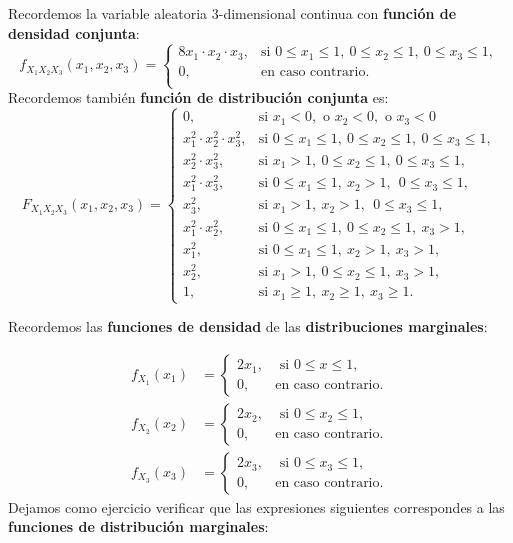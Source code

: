 \documentclass[]{book}
\begin{document}
Recordemos la variable aleatoria \(3\)-dimensional continua con \textbf{función de densidad conjunta}:
\[
f_{X_1X_2X_3}(x_1,x_2,x_3)=\begin{cases}
8 x_1\cdot x_2\cdot x_3, & \mbox{si }0\leq x_1\leq 1,\ 0\leq x_2\leq 1,\ 0\leq x_3\leq 1, \\
0, & \mbox{en caso contrario.}\\
\end{cases}
\]
Recordemos también \textbf{función de distribución conjunta} es:
\[
F_{X_1X_2X_3}(x_1,x_2,x_3)=\begin{cases}
0, & \mbox{si }x_1<0,\mbox{ o }x_2<0,\mbox{ o }x_3 <0\\
x_1^2\cdot x_2^2\cdot x_3^2, & \mbox{si }0\leq x_1\leq 1,\ 0\leq x_2\leq 1,\ 0\leq x_3\leq 1, \\
 x_2^2\cdot x_3^2, & \mbox{si }x_1> 1,\ 0\leq x_2\leq  1,\ 0\leq x_3\leq  1, \\
 x_1^2\cdot x_3^2, & \mbox{si }0\leq x_1\leq  1,\ x_2> 1,\ \ 0\leq x_3\leq  1, \\
 x_3^2, & \mbox{si }x_1> 1,\ x_2> 1,\ \ 0\leq x_3\leq  1, \\
 x_1^2\cdot x_2^2, & \mbox{si }0\leq x_1\leq  1,\ 0\leq x_2\leq  1,\ x_3> 1,\\
 x_1^2, & \mbox{si }0\leq x_1\leq  1,\ x_2 >  1,\ x_3> 1,\\
 x_2^2, & \mbox{si }x_1>1,\ 0\leq x_2\leq  1,\ x_3> 1,\\
1, & \mbox{si }x_1\geq 1,\ x_2\geq 1,\ x_3\geq 1.
\end{cases}
\]

Recordemos las \textbf{funciones de densidad} de las \textbf{distribuciones marginales}:

\[
\begin{array}{rl}
f_{X_1}(x_1) & =\begin{cases}
2x_1, & \mbox{ si }0\leq x\leq 1,\\
0, & \mbox{en caso contrario.}
\end{cases}\\ 
f_{X_2}(x_2)&=\begin{cases}
2x_2, & \mbox{ si }0\leq x_2\leq 1,\\
0, & \mbox{en caso contrario.}
\end{cases}\\ f_{X_3}(x_3) & =\begin{cases}
2x_3, & \mbox{ si }0\leq x_3\leq 1,\\
0, & \mbox{en caso contrario.}
\end{cases}
\end{array}
\]
Dejamos como ejercicio verificar que las expresiones siguientes correspondes a las \textbf{funciones de distribución marginales}:
\end{document}
